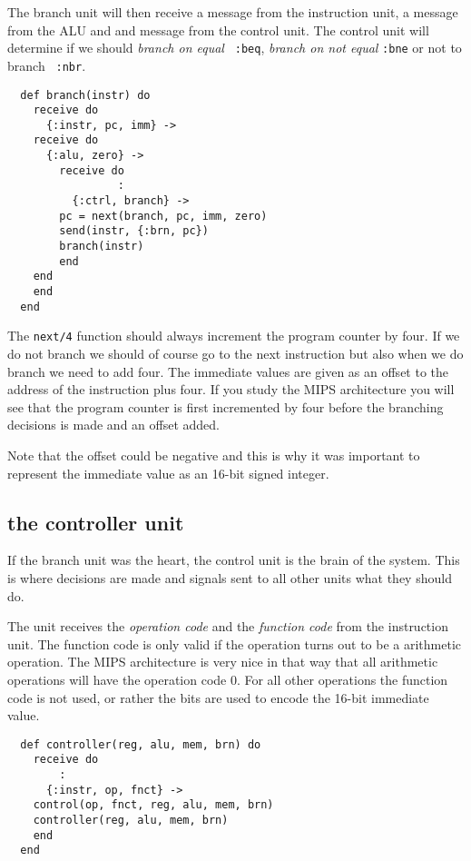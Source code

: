 \documentclass[a4paper,11pt]{article}
\begin{document}
The branch unit will then receive a message from the instruction unit,
a message from the ALU and and message from the control unit. The
control unit will determine if we should {\em branch on equal} {\tt
  :beq}, {\em branch on not equal} {\tt :bne} or not to branch {\tt
  :nbr}.

\begin{verbatim}
  def branch(instr) do
    receive do
      {:instr, pc, imm} ->
	receive do
	  {:alu, zero} ->
	    receive do 
                 :
	      {:ctrl, branch} ->
		pc = next(branch, pc, imm, zero)
		send(instr, {:brn, pc})
		branch(instr)		
	    end
	end
    end
  end
\end{verbatim}

The {\tt next/4} function should always increment the program counter
by four. If we do not branch we should of course go to the next
instruction but also when we do branch we need to add four. The
immediate values are given as an offset to the address of the
instruction plus four. If you study the MIPS architecture you will see
that the program counter is first incremented by four before the
branching decisions is made and an offset added.

Note that the offset could be negative and this is why it was
important to represent the immediate value as an 16-bit signed
integer.


\subsection*{the controller unit}

If the branch unit was the heart, the control unit is the brain of the
system. This is where decisions are made and signals sent to all
other units what they should do.

The unit receives the {\em operation code} and the {\em function code}
from the instruction unit. The function code is only valid if the
operation turns out to be a arithmetic operation. The MIPS
architecture is very nice in that way that all arithmetic operations
will have the operation code $0$. For all other operations the
function code is not used, or rather the bits are used to encode the
16-bit immediate value.


\begin{verbatim}
  def controller(reg, alu, mem, brn) do
    receive do
        :
      {:instr, op, fnct} ->
	control(op, fnct, reg, alu, mem, brn)
	controller(reg, alu, mem, brn)
    end
  end
\end{verbatim}
\end{document}
